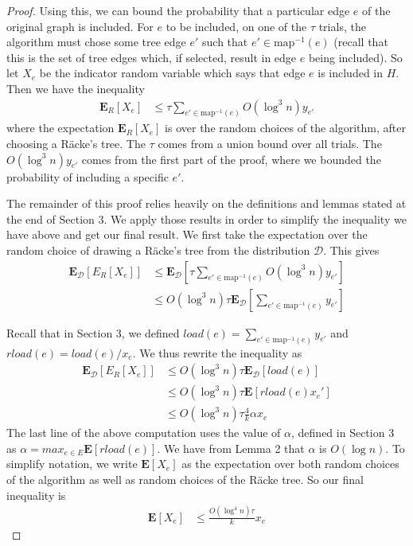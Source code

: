 \documentclass[12pt]{article}
\begin{document}
\begin{proof}
Using this, we can bound the probability that a particular edge $e$ of the original graph is included. For $e$ to be included, on one of the $\tau$ trials, the algorithm must chose some tree edge $e'$ such that $e' \in \mathrm{map}^{-1}(e)$ (recall that this is the set of tree edges which, if selected, result in edge $e$ being included). So let $X_e$ be the indicator random variable which says that edge $e$ is included in $H$. Then we have the inequality
\begin{align}
 \textbf{E}_{R}[X_e] &\leq \tau \sum_{e' \in \mathrm{map}^{-1}(e)} O(\log^3 n) y_{e'} 
\end{align}
where the expectation $\textbf{E}_{R}[X_e]$ is over the random choices of the algorithm, after choosing a R\"{a}cke's tree. The $\tau$ comes from a union bound over all trials. The $O(\log^3 n)y_{e'}$ comes from the first part of the proof, where we bounded the probability of including a specific $e'$. 

The remainder of this proof relies heavily on the definitions and lemmas stated at the end of Section 3. We apply those results in order to simplify the inequality we have above and get our final result. We first take the expectation over the random choice of drawing a R\"{a}cke's tree from the distribution $\mathcal{D}$. This gives
\begin{align}
\textbf{E}_{\mathcal{D}}[E_{R}[X_e]] &\leq \textbf{E}_{\mathcal{D}}[\tau \sum_{e' \in \mathrm{map}^{-1}(e)} O(\log^3 n) y_{e'}] \\
               &\leq O(\log^3 n) \tau \textbf{E}_{\mathcal{D}}[\sum_{e' \in \mathrm{map}^{-1}(e)} y_{e'}]
\end{align}

Recall that in Section 3, we defined $load(e) = \sum_{e' \in \mathrm{map}^{-1}(e)} y_{e'}$ and $rload(e) = load(e)/x_e$. We thus rewrite the inequality as
\begin{align}
              \textbf{E}_{\mathcal{D}}[E_{R}[X_e]]  & \leq O(\log^3 n) \tau \textbf{E}_{\mathcal{D}}[load(e)]\\
&\leq O(\log^3 n) \tau \textbf{E}[rload(e) x_e'] \\
                &\leq O(\log^3 n) \tau \frac{4}{k} \alpha x_e
\end{align}
The last line of the above computation uses the value of $\alpha$, defined in Section 3 as $\alpha = max_{e \in E}\textbf{E}[rload(e)]$. We have from Lemma 2 that $\alpha$ is $O(\log n)$. To simplify notation, we write $\textbf{E}[X_e]$ as the expectation over both random choices of the algorithm as well as random choices of the R\"{a}cke tree. So our final inequality is 
\begin{align}
 \textbf{E}[X_e] &\leq \frac{O(\log^4 n)\tau}{k} x_e 
\end{align}


\end{proof}
\end{document}
